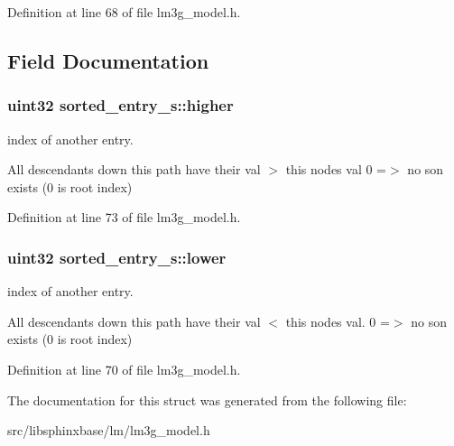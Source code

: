 Definition at line 68 of file lm3g\+\_\+model.\+h.



\subsection{Field Documentation}
\subsubsection[{higher}]{\setlength{\rightskip}{0pt plus 5cm}uint32 sorted\+\_\+entry\+\_\+s\+::higher}\label{structsorted__entry__s_a0b7f0225403703a4daa3780593db7237}


index of another entry. 

All descendants down this path have their val $>$ this node\textquotesingle{}s val 0 =$>$ no son exists (0 is root index) 

Definition at line 73 of file lm3g\+\_\+model.\+h.

\subsubsection[{lower}]{\setlength{\rightskip}{0pt plus 5cm}uint32 sorted\+\_\+entry\+\_\+s\+::lower}\label{structsorted__entry__s_a248960abac597c0f615ab01822f6d559}


index of another entry. 

All descendants down this path have their val $<$ this node\textquotesingle{}s val. 0 =$>$ no son exists (0 is root index) 

Definition at line 70 of file lm3g\+\_\+model.\+h.



The documentation for this struct was generated from the following file\+:\begin{DoxyCompactItemize}
\item 
src/libsphinxbase/lm/lm3g\+\_\+model.\+h\end{DoxyCompactItemize}
